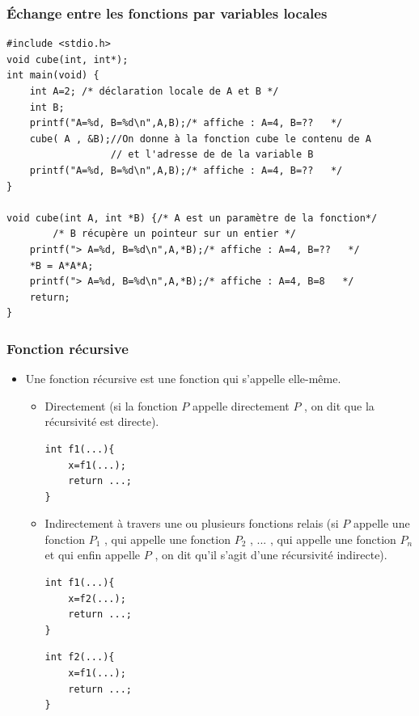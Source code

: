 \documentclass{beamer}
\begin{document}
\begin{frame}[fragile]
\frametitle{Échange entre les fonctions par variables locales}

\begin{verbatim}
#include <stdio.h>                         
void cube(int, int*);
int main(void) {
    int A=2; /* déclaration locale de A et B */
    int B;
    printf("A=%d, B=%d\n",A,B);/* affiche : A=4, B=??   */
    cube( A , &B);//On donne à la fonction cube le contenu de A 
                  // et l'adresse de de la variable B
    printf("A=%d, B=%d\n",A,B);/* affiche : A=4, B=??   */	
}

void cube(int A, int *B) {/* A est un paramètre de la fonction*/
		/* B récupère un pointeur sur un entier */
    printf("> A=%d, B=%d\n",A,*B);/* affiche : A=4, B=??   */
    *B = A*A*A;
    printf("> A=%d, B=%d\n",A,*B);/* affiche : A=4, B=8   */
    return;
}

\end{verbatim}

\end{frame}
\begin{frame}[fragile]
\frametitle{Fonction récursive }
\begin{itemize}
\item Une fonction récursive est une fonction qui s'appelle elle-même. 
\begin{itemize}
\item Directement (si la fonction $P$ appelle directement $P$ , on dit que la récursivité est directe). 
\begin{verbatim}
int f1(...){
    x=f1(...);
    return ...;
}
\end{verbatim}
\item  Indirectement à travers une ou plusieurs fonctions relais (si $P$ appelle une fonction $P_1$ , qui appelle une fonction $P_2$ , ... , qui appelle une fonction $P_n$ et qui enfin appelle $P$ , on dit qu'il s'agit d'une récursivité indirecte).

\begin{minipage}[c]{0.48\linewidth}
\begin{verbatim}
int f1(...){
    x=f2(...);
    return ...;
}
\end{verbatim}
\end{minipage}
\begin{minipage}[c]{0.48\linewidth}
    \begin{verbatim}
int f2(...){
    x=f1(...);
    return ...;
}
\end{verbatim}
\end{minipage}
\end{itemize}
\end{itemize}
\end{frame}
\end{document}

